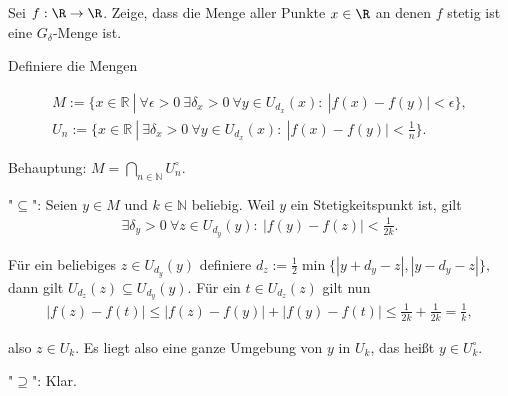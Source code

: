\begin{exercise}
Sei $f: \R \rightarrow \R$. Zeige, dass die Menge aller Punkte $x \in \R$ an
denen $f$ stetig ist eine $G_{\delta}$-Menge ist.
\end{exercise}
\begin{solution}
  Definiere die Mengen

  \begin{align}
  M := \{x \in \mathbb{R} ~|~ \forall \epsilon > 0 ~\exists \delta_x > 0 ~\forall y \in U_{d_x}(x): ~|f(x)-f(y)| < \epsilon\}, \\
  U_n := \{x \in \mathbb{R} ~|~ \exists \delta_x > 0 ~\forall y \in U_{d_x}(x): ~|f(x)-f(y)| < \frac{1}{n}\}.
  \end{align}

  Behauptung: $M = \bigcap_{n \in \mathbb{N}} U_n^\circ.$

  "$\subseteq$": Seien $y \in M$ und $k \in \mathbb{N}$ beliebig. Weil $y$ ein Stetigkeitspunkt ist, gilt
  \begin{align}
      \exists \delta_y > 0 ~\forall z \in U_{d_y}(y): ~|f(y)-f(z)| < \frac{1}{2k}.
  \end{align}

  Für ein beliebiges $z \in U_{d_y}(y)$ definiere $d_z := \frac{1}{2} \min\{|y + d_y - z|, |y - d_y - z|\},$ dann gilt $U_{d_z}(z) \subseteq U_{d_y}(y).$ Für ein $t \in U_{d_z}(z)$ gilt nun
  \begin{align}
      |f(z)-f(t)| \leq |f(z)-f(y)| + |f(y)-f(t)| \leq \frac{1}{2k} + \frac{1}{2k} = \frac{1}{k},
  \end{align}

  also $z \in U_k$. Es liegt also eine ganze Umgebung von $y$ in $U_k$, das heißt $y \in U_k^\circ.$


  "$\supseteq$": Klar.
\end{solution}
